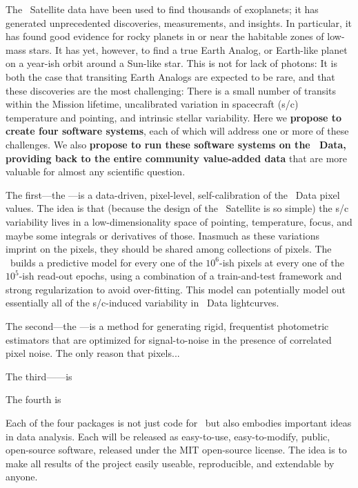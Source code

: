 \documentclass[letterpaper,12pt]{article}
\begin{document}
The \Kepler\ Satellite data have been used to find thousands of exoplanets;
it has generated unprecedented discoveries, measurements, and insights.
In particular, it has found good evidence for rocky planets in or near the
habitable zones of low-mass stars.
It has yet, however, to find a true Earth Analog, or Earth-like planet on a
year-ish orbit around a Sun-like star.
This is not for lack of photons:
It is both the case that transiting Earth Analogs are expected to be rare, and
that these discoveries are the most challenging:
There is a small number of transits within the Mission lifetime,
uncalibrated variation in spacecraft (s/c) temperature and pointing,
and intrinsic stellar variability.
Here we \textbf{propose to create four software systems}, each of which will
address one or more of these challenges.
We also \textbf{propose to run these software systems on the \Kepler\ Data,
providing back to the entire community value-added data} that are more valuable
for almost any scientific question.

The first---the \PLM---is a data-driven, pixel-level, self-calibration of the
\Kepler\ Data pixel values.  
The idea is that (because the design of the \Kepler\ Satellite is so simple)
the s/c variability lives in a low-dimensionality space of pointing,
temperature, focus, and maybe some integrals or derivatives of those.
Inasmuch as these variations imprint on the pixels, they should be shared among
collections of pixels.
The \PLM\ builds a predictive model for every one of the $10^6$-ish pixels at
every one of the $10^5$-ish read-out epochs, using a combination of a
train-and-test framework and strong regularization to avoid over-fitting.
This model can potentially model out essentially all of the s/c-induced
variability in \Kepler\ Data lightcurves.

The second---the \OWL---is a method for generating rigid, frequentist
photometric estimators that are optimized for signal-to-noise in the presence
of correlated pixel noise.
The only reason that pixels...

The third---\George---is 

The fourth is \kpsf

Each of the four packages is not just code for \Kepler\ but also embodies
important ideas in data analysis.
Each will be released as easy-to-use, easy-to-modify, public, open-source
software, released under the MIT open-source license.
The idea is to make all results of the project easily useable, reproducible, and
extendable by anyone.
\end{document}
